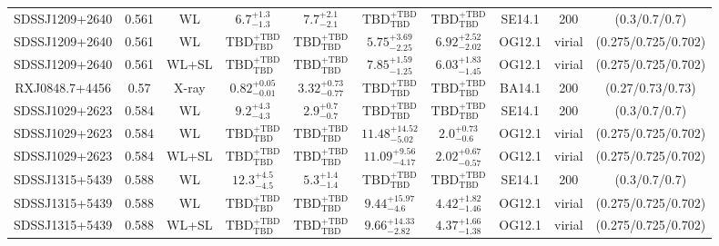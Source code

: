 \begin{table}
\begin{tabular}{cccccccccc}
SDSSJ1209+2640 & 0.561 & WL & ${6.7}^{+1.3}_{-1.3}$ & ${7.7}^{+2.1}_{-2.1}$ & ${\mathrm{TBD}}^{+\mathrm{TBD}}_{\mathrm{TBD}}$ & ${\mathrm{TBD}}^{+\mathrm{TBD}}_{\mathrm{TBD}}$ & SE14.1 & 200 & (0.3/0.7/0.7) \\
SDSSJ1209+2640 & 0.561 & WL & ${\mathrm{TBD}}^{+\mathrm{TBD}}_{\mathrm{TBD}}$ & ${\mathrm{TBD}}^{+\mathrm{TBD}}_{\mathrm{TBD}}$ & ${5.75}^{+3.69}_{-2.25}$ & ${6.92}^{+2.52}_{-2.02}$ & OG12.1 & virial & (0.275/0.725/0.702) \\
SDSSJ1209+2640 & 0.561 & WL+SL & ${\mathrm{TBD}}^{+\mathrm{TBD}}_{\mathrm{TBD}}$ & ${\mathrm{TBD}}^{+\mathrm{TBD}}_{\mathrm{TBD}}$ & ${7.85}^{+1.59}_{-1.25}$ & ${6.03}^{+1.83}_{-1.45}$ & OG12.1 & virial & (0.275/0.725/0.702) \\
RXJ0848.7+4456 & 0.57 & X-ray & ${0.82}^{+0.05}_{-0.01}$ & ${3.32}^{+0.73}_{-0.77}$ & ${\mathrm{TBD}}^{+\mathrm{TBD}}_{\mathrm{TBD}}$ & ${\mathrm{TBD}}^{+\mathrm{TBD}}_{\mathrm{TBD}}$ & BA14.1 & 200 & (0.27/0.73/0.73) \\
SDSSJ1029+2623 & 0.584 & WL & ${9.2}^{+4.3}_{-4.3}$ & ${2.9}^{+0.7}_{-0.7}$ & ${\mathrm{TBD}}^{+\mathrm{TBD}}_{\mathrm{TBD}}$ & ${\mathrm{TBD}}^{+\mathrm{TBD}}_{\mathrm{TBD}}$ & SE14.1 & 200 & (0.3/0.7/0.7) \\
SDSSJ1029+2623 & 0.584 & WL & ${\mathrm{TBD}}^{+\mathrm{TBD}}_{\mathrm{TBD}}$ & ${\mathrm{TBD}}^{+\mathrm{TBD}}_{\mathrm{TBD}}$ & ${11.48}^{+14.52}_{-5.02}$ & ${2.0}^{+0.73}_{-0.6}$ & OG12.1 & virial & (0.275/0.725/0.702) \\
SDSSJ1029+2623 & 0.584 & WL+SL & ${\mathrm{TBD}}^{+\mathrm{TBD}}_{\mathrm{TBD}}$ & ${\mathrm{TBD}}^{+\mathrm{TBD}}_{\mathrm{TBD}}$ & ${11.09}^{+9.56}_{-4.17}$ & ${2.02}^{+0.67}_{-0.57}$ & OG12.1 & virial & (0.275/0.725/0.702) \\
SDSSJ1315+5439 & 0.588 & WL & ${12.3}^{+4.5}_{-4.5}$ & ${5.3}^{+1.4}_{-1.4}$ & ${\mathrm{TBD}}^{+\mathrm{TBD}}_{\mathrm{TBD}}$ & ${\mathrm{TBD}}^{+\mathrm{TBD}}_{\mathrm{TBD}}$ & SE14.1 & 200 & (0.3/0.7/0.7) \\
SDSSJ1315+5439 & 0.588 & WL & ${\mathrm{TBD}}^{+\mathrm{TBD}}_{\mathrm{TBD}}$ & ${\mathrm{TBD}}^{+\mathrm{TBD}}_{\mathrm{TBD}}$ & ${9.44}^{+15.97}_{-4.6}$ & ${4.42}^{+1.82}_{-1.46}$ & OG12.1 & virial & (0.275/0.725/0.702) \\
SDSSJ1315+5439 & 0.588 & WL+SL & ${\mathrm{TBD}}^{+\mathrm{TBD}}_{\mathrm{TBD}}$ & ${\mathrm{TBD}}^{+\mathrm{TBD}}_{\mathrm{TBD}}$ & ${9.66}^{+14.33}_{-2.82}$ & ${4.37}^{+1.66}_{-1.38}$ & OG12.1 & virial & (0.275/0.725/0.702) \\

\end{tabular}
\end{table}
